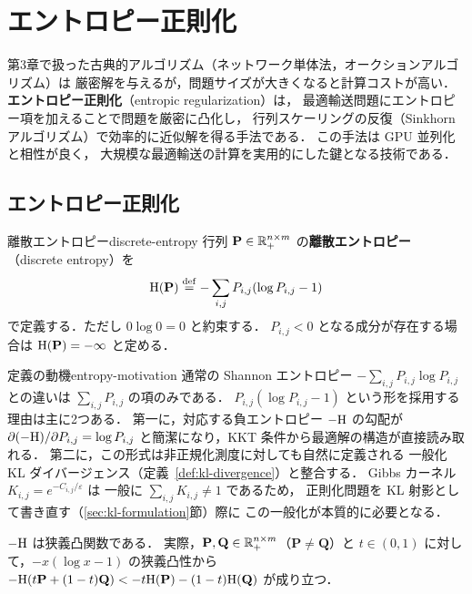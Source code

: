 \chapter{エントロピー正則化}
\label{ch:entropic}

第3章で扱った古典的アルゴリズム（ネットワーク単体法，オークションアルゴリズム）は
厳密解を与えるが，問題サイズが大きくなると計算コストが高い．
\textbf{エントロピー正則化}（entropic regularization）は，
最適輸送問題にエントロピー項を加えることで問題を厳密に凸化し，
行列スケーリングの反復（Sinkhorn アルゴリズム）で効率的に近似解を得る手法である．
この手法は GPU 並列化と相性が良く，
大規模な最適輸送の計算を実用的にした鍵となる技術である．

\section{エントロピー正則化}
\label{sec:entropic-reg}

\begin{definition}{離散エントロピー}{discrete-entropy}
  行列 $\mathbf{P} \in \mathbb{R}_+^{n \times m}$ の\textbf{離散エントロピー}（discrete entropy）を
  \[
    \mathrm{H}(\mathbf{P}) \overset{\mathrm{def}}{=} - \sum_{i,j} P_{i,j} (\log P_{i,j} - 1)
  \]
  で定義する．ただし $0 \log 0 = 0$ と約束する．
  $P_{i,j} < 0$ となる成分が存在する場合は $\mathrm{H}(\mathbf{P}) = -\infty$ と定める．
\end{definition}

\begin{remark}{定義の動機}{entropy-motivation}
  通常の Shannon エントロピー $-\sum_{i,j} P_{i,j} \log P_{i,j}$ との違いは
  $\sum_{i,j} P_{i,j}$ の項のみである．
  $P_{i,j}(\log P_{i,j} - 1)$ という形を採用する理由は主に2つある．
  第一に，対応する負エントロピー $-\mathrm{H}$ の勾配が
  $\partial(-\mathrm{H})/\partial P_{i,j} = \log P_{i,j}$
  と簡潔になり，KKT 条件から最適解の構造が直接読み取れる．
  第二に，この形式は非正規化測度に対しても自然に定義される
  一般化 KL ダイバージェンス（定義~\ref{def:kl-divergence}）と整合する．
  Gibbs カーネル $K_{i,j} = e^{-C_{i,j}/\varepsilon}$ は
  一般に $\sum_{i,j} K_{i,j} \neq 1$ であるため，
  正則化問題を KL 射影として書き直す（\ref{sec:kl-formulation}節）際に
  この一般化が本質的に必要となる．
\end{remark}

$-\mathrm{H}$ は狭義凸関数である．
実際，$\mathbf{P}, \mathbf{Q} \in \mathbb{R}_{+}^{n \times m}$（$\mathbf{P} \neq \mathbf{Q}$）と
$t \in (0, 1)$ に対して，$-x(\log x - 1)$ の狭義凸性から
$-\mathrm{H}(t\mathbf{P} + (1-t)\mathbf{Q}) < -t\mathrm{H}(\mathbf{P}) - (1-t)\mathrm{H}(\mathbf{Q})$
が成り立つ．

